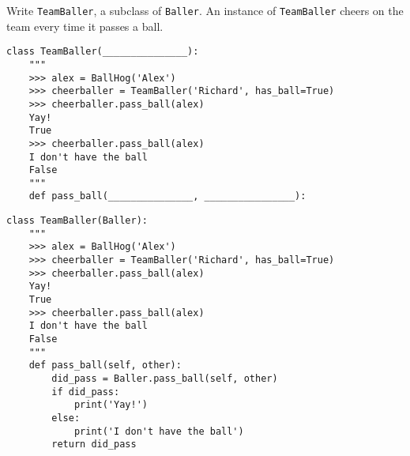 \begin{blocksection}
Write \lstinline$TeamBaller$, a subclass of \lstinline$Baller$. An instance of \lstinline$TeamBaller$ cheers on the team every time it passes a ball.

\ifprintanswers\else
\begin{lstlisting}
class TeamBaller(_______________):
    """
    >>> alex = BallHog('Alex')
    >>> cheerballer = TeamBaller('Richard', has_ball=True)
    >>> cheerballer.pass_ball(alex)
    Yay!
    True
    >>> cheerballer.pass_ball(alex)
    I don't have the ball
    False
    """
    def pass_ball(_______________, ________________):
\end{lstlisting}
\fi

\begin{solution}[1in]
\begin{lstlisting}
class TeamBaller(Baller):
    """
    >>> alex = BallHog('Alex')
    >>> cheerballer = TeamBaller('Richard', has_ball=True)
    >>> cheerballer.pass_ball(alex)
    Yay!
    True
    >>> cheerballer.pass_ball(alex)
    I don't have the ball
    False
    """
    def pass_ball(self, other):
        did_pass = Baller.pass_ball(self, other)
        if did_pass:
            print('Yay!')
        else:
            print('I don't have the ball')
        return did_pass
\end{lstlisting}
\end{solution}
\end{blocksection}
